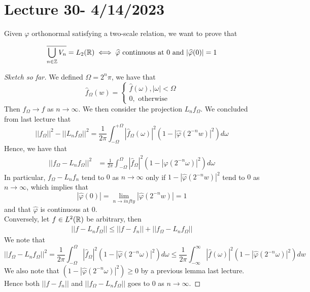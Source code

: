 \documentclass{article}
\begin{document}
{\newpage
\section{Lecture 30- 4/14/2023}

Given $\varphi$ orthonormal satisfying a two-scale relation, we want to prove that
\begin{theorem}
\[ \overline{\bigcup_{n \in \mathbb{Z}} V_n} = L_2(\mathbb{R}) \iff \widehat{\varphi} \text{ continuous at $0$ and } |\widehat{\varphi}(0)| = 1 \]  
\end{theorem}

\begin{proof}[Sketch so far]
    We defined $\Omega = 2^n \pi$, we have that
    \[\widehat{f}_\Omega(w) = \begin{cases}
        \widehat{f}(\omega), |\omega| < \Omega\\
        0, \text{ otherwise}
    \end{cases}\]
    Then $f_\Omega \to f$ as $n \to \infty$. We then consider the projection $L_n f_\Omega$. We concluded from last lecture that
    \[||f_\Omega||^2 - ||L_n f_\Omega||^2 = \frac{1}{2\pi} \int_{-\Omega}^{+\Omega} |\widehat{f}_\Omega(\omega)|^2(1 - |\widehat{\varphi}(2^{-n} w)|^2) d\omega\]
Hence, we have that
\begin{align*}
    ||f_\Omega - L_n f_\Omega||^2 &= \frac{1}{2\pi} \int_{-\Omega}^{\Omega} |\widehat{f}_\Omega|^2 (1 - |\widehat{\varphi}(2^{-n} \omega)|^2) d\omega
\end{align*}
In particular, $f_\Omega - L_n f_n$ tend to $0$ as $n \to \infty$ only if $1 - |\widehat{\varphi}(2^{-n} w)|^2$ tend to $0$ as $n \to \infty$, which implies that
\[|\widehat{\varphi}(0)| = \lim_{n \to infty} |\widehat{\varphi}(2^{-n} w)| = 1\]
and that $\widehat{\varphi}$ is continuous at $0$.\\

Conversely, let $f \in L^2(\mathbb{R})$ be arbitrary, then
\begin{align*}
    ||f - L_n f_\Omega|| \leq ||f - f_n|| + ||f_\Omega - L_n f_\Omega||
\end{align*}
We note that
\[||f_\Omega - L_n f_\Omega||^2 = \frac{1}{2\pi} \int_{-\Omega}^{\Omega} |\widehat{f}_\Omega|^2 (1 - |\widehat{\varphi}(2^{-n} \omega)|^2) d\omega \leq \frac{1}{2\pi} \int_{-\infty}^{\infty} |\widehat{f}(\omega)|^2 (1 - |\widehat{\varphi}(2^{-n} \omega)|^2) dw\]
We also note that $(1 - |\widehat{\varphi}(2^{-n} \omega)|^2) \geq 0$ by a previous lemma last lecture. Hence both $||f - f_n||$ and $||f_\Omega - L_n f_\Omega||$ goes to $0$ as $n \to \infty$. 
\end{proof}

}
\end{document}
